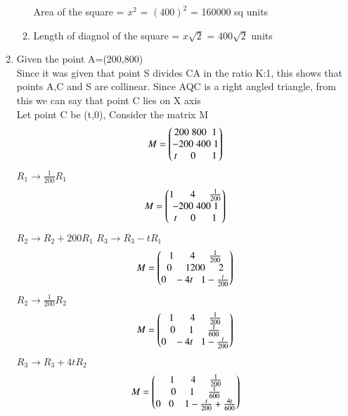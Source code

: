 \documentclass[journal]{IEEEtran}
\begin{document}
\begin{enumerate}[label=(\alph*)]
\begin{enumerate}[label=(\roman*)]
                Area of the square = $x^2$ = $(400)^2$ = 160000 sq units\\
                \item Length of diagnol of the square = $x\sqrt{2}$ = $400\sqrt{2}$ units\\
            \end{enumerate}
            \item Given the point A=(200,800)\\
            Since it was given that point S divides CA in the ratio K:1, this shows that points A,C and S are collinear. Since AQC is a right angled triangle, from this we can say that point C lies on X axis\\
            Let point C be (t,0), Consider the matrix M\\
            \begin{align}
                M = \begin{pmatrix}200\;800\;\;1\\-200\;400\;1\\t\;\;\;\;\;0\;\;\;\;\;\;1\end{pmatrix}
            \end{align}
            {\large$R_1\rightarrow{}\frac{1}{200}R_1$}
            \begin{align}
                 M = \begin{pmatrix}1\;\;\;\;\;\;4\;\;\;\;\;\frac{1}{200}\\-200\;400\;1\\t\;\;\;\;\;0\;\;\;\;\;\;1\end{pmatrix}
            \end{align}
            {\large$R_2\rightarrow{}R_2 + 200R_1$}\hspace{2cm}
            {\large$R_3\rightarrow{R_3 - tR_1}$}
            \begin{align}
                 M = \begin{pmatrix}1\;\;\;\;\;\;4\;\;\;\;\;\frac{1}{200}\\0\;\;\;\;\;1200\;\;\;\;\;2\\0\;\;\;-4t\;\;\;1-\frac{t}{200}\end{pmatrix}
            \end{align}
            {\large$R_2\rightarrow{\frac{1}{200}R_2}$}
            \begin{align}
                M = \begin{pmatrix}1\;\;\;\;\;\;4\;\;\;\;\;\frac{1}{200}\\0\;\;\;\;\;1\;\;\;\;\;\frac{1}{600}\\0\;\;\;-4t\;\;\;1-\frac{t}{200}\end{pmatrix}
            \end{align}
            {\large$R_3\rightarrow{R_3 + 4tR_2}$}
            \begin{align}
                M = \myvec{1\;\;\;\;\;\;4\;\;\;\;\;\frac{1}{200}\\0\;\;\;\;\;1\;\;\;\;\;\frac{1}{600}\\0\;\;\;0\;\;\;\;1-\frac{t}{200}+\frac{4t}{600}}

\end{align}
\end{enumerate}
\end{document}
